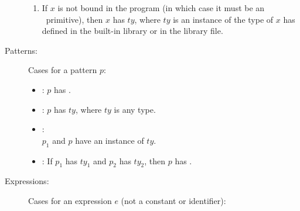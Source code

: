 \documentclass[11pt]{article}
\begin{document}
\begin{description}
\begin{enumerate}
          \item If $x$ is not bound in the program (in which case it must be an
	        \ML\ primitive), then $x$ has $ty$, where $ty$ is an instance of
	        the type of $x$ has defined in the built-in library or
                in the library file.
  \end{enumerate}

  \item [Patterns: ]

        Cases for a pattern $p$:
        \begin{itemize}\vspace*{-2mm}

          \item \ttQ{()}:
                $p$ has .

          \item \ttQ{\_}:
                $p$ has $ty$, where $ty$ is any type.

          \item {}:
	       	\\
                $p_1$ and $p$ have an instance of $ty$.

          \item {}: If $p_1$ has $ty_1$ and $p_2$ has $ty_2$,
                 then $p$ has .



        \end{itemize}

  \item [Expressions: ]

        Cases for an expression $e$ (not a constant or identifier):


\end{description}
\end{document}
